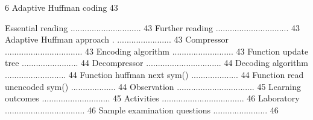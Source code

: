 6 Adaptive Huffman coding 43

Essential reading .............................. 43
Further reading ............................... 43
Adaptive Huffman approach . ....................... 43
Compressor ................................. 43
Encoding algorithm .......................... 43
Function update tree ........................ 44
Decompressor ................................ 44
Decoding algorithm .......................... 44
Function huffman next sym() .................... 44
Function read unencoded sym() ................... 44
Observation ................................. 45
Learning outcomes ............................. 45
Activities ................................... 46
Laboratory .................................. 46
Sample examination questions ....................... 46

